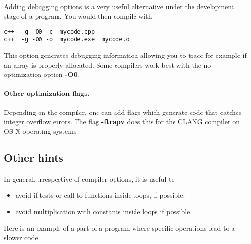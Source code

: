 \paragraph{}
Adding debugging options is a very useful alternative under the development stage of a program.
You would then compile with 



\begin{verbatim}
c++  -g -O0 -c  mycode.cpp
c++  -g -O0 -o  mycode.exe  mycode.o

\end{verbatim}

This option generates debugging information allowing you to trace for example if an array is properly allocated. Some compilers work best with the no optimization option \textbf{-O0}.



\paragraph{Other optimization flags.}
Depending on the compiler, one can add flags which generate code that catches integer overflow errors. 
The flag \textbf{-ftrapv} does this for the CLANG compiler on OS X operating systems.



\subsection*{Other hints}

\paragraph{}
In general, irrespective of compiler options, it is useful to
\begin{itemize}
\item avoid if tests or call to functions inside loops, if possible. 

\item avoid multiplication with constants inside loops if possible
\end{itemize}

\noindent
Here is an example of a part of a program where specific operations lead to a slower code






